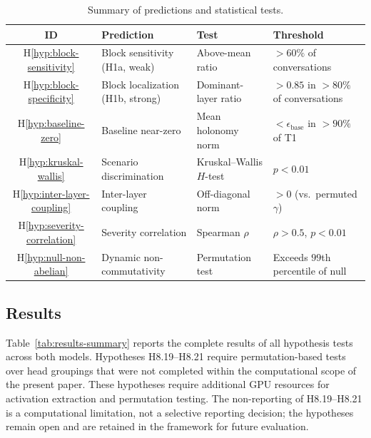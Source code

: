 \begin{table}[h]
\centering
\caption{Summary of predictions and statistical tests.}
\label{tab:predictions-summary}
\begin{tabular}{@{}clll@{}}
\toprule
\textbf{ID} & \textbf{Prediction} & \textbf{Test} & \textbf{Threshold} \\
\midrule
H\ref{hyp:block-sensitivity} & Block sensitivity (H1a, weak) & Above-mean ratio & $> 60\%$
of conversations \\
H\ref{hyp:block-specificity} & Block localization (H1b, strong) & Dominant-layer ratio & $> 0.85$
in $> 80\%$ of conversations \\
H\ref{hyp:baseline-zero} & Baseline near-zero & Mean holonomy norm & $< \epsilon_{\mathrm{base}}$
in $> 90\%$ of T1 \\
H\ref{hyp:kruskal-wallis} & Scenario discrimination & Kruskal--Wallis $H$-test & $p < 0.01$ \\
H\ref{hyp:inter-layer-coupling} & Inter-layer coupling & Off-diagonal norm & $> 0$ (vs.\
permuted $\gamma$) \\
H\ref{hyp:severity-correlation} & Severity correlation & Spearman $\rho$ & $\rho > 0.5$,
$p < 0.01$ \\
H\ref{hyp:null-non-abelian} & Dynamic non-commutativity & Permutation test & Exceeds $99$th
percentile of null \\
\bottomrule
\end{tabular}
\end{table}

\subsection{Results}
\label{sec:results}

Table~\ref{tab:results-summary} reports the complete results of all hypothesis tests
across both models. Hypotheses H8.19--H8.21 require permutation-based tests over head
groupings that were not completed within the computational scope of the present paper.
These hypotheses require additional GPU resources for activation extraction and
permutation testing. The non-reporting of H8.19--H8.21 is a computational
limitation, not a selective reporting decision; the hypotheses remain open and are retained
in the framework for future evaluation.

